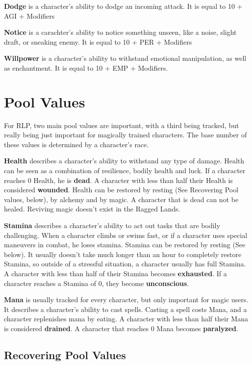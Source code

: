 \textbf{Dodge} is a character's ability to dodge an incoming attack. It is equal to 10 + AGI + Modifiers


\textbf{Notice} is a carachter's ability to notice something unseen, like a noise, slight draft, or sneaking enemy. It is equal to 10 + PER + Modifiers


\textbf{Willpower} is a character's ability to withstand emotional manipulation, as well as enchantment. It is equal to 10 + EMP + Modifiers.


\section{Pool Values}
For RLP, two main pool values are important, with a third being tracked, but really being just important for magically trained characters. The base number of these values is determined by a character's race.


\textbf{Health} describes a character’s ability to withstand any type of damage. Health can be seen as a combination of resilience, bodily health and luck. If a character reaches 0 Health, he is \textbf{dead}. A character with less than half their Health is considered \textbf{wounded}. Health can be restored by resting (See Recovering Pool values, below), by alchemy and by magic. A character that is dead can not be healed. Reviving magic doesn’t exist in the Ragged Lands.


\textbf{Stamina} describes a character’s ability to act out tasks that are bodily challenging. When a character climbs or swims fast, or if a character uses special maneuvers in combat, he loses stamina. Stamina can be restored by resting (See below). It usually doesn’t take much longer than an hour to completely restore Stamina, so outside of a stressful situation, a character usually has full Stamina. A character with less than half of their Stamina becomes \textbf{exhausted}. If a character reaches a Stamina of 0, they become \textbf{unconscious}.


\textbf{Mana} is usually tracked for every character, but only important for magic users. It describes a character’s ability to cast spells. Casting a spell costs Mana, and a character replenishes mana by eating. A character with less than half their Mana is considered \textbf{drained}. A character that reaches 0 Mana becomes \textbf{paralyzed}.


\subsection{Recovering Pool Values}

